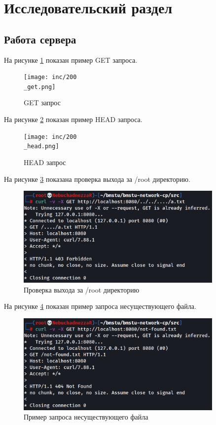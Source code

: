 \section{Исследовательский раздел}

\subsection{Работа сервера}

На рисунке \ref{fig:200get} показан пример GET запроса.

\begin{figure}[H]
	\centering
	\texttt{[image: inc/200\\\_get.png]}
	\caption{GET запрос}
	\label{fig:200get}
\end{figure}

На рисунке \ref{fig:200head} показан пример HEAD запроса.

\begin{figure}[H]
	\centering
	\texttt{[image: inc/200\\\_head.png]}
	\caption{HEAD запрос}
	\label{fig:200head}
\end{figure}

На рисунке \ref{fig:403} показана проверка выхода за /root директорию.

\begin{figure}[H]
	\centering
	\includegraphics[width=0.9\textwidth]{inc/403.png}
	\caption{Проверка выхода за /root директорию}
	\label{fig:403}
\end{figure}

На рисунке \ref{fig:404} показан пример запроса несуществующего файла.

\begin{figure}[H]
	\centering
	\includegraphics[width=0.9\textwidth]{inc/404.png}
	\caption{Пример запроса несуществующего файла}
	\label{fig:404}
\end{figure}

